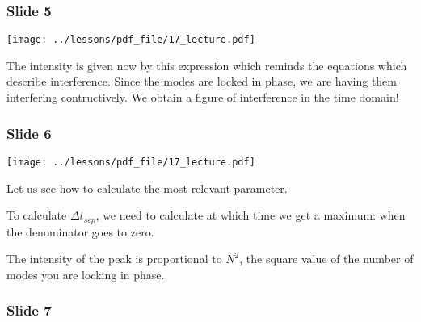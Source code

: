\documentclass[../main/main.tex]{subfiles}
\begin{document}
\subsubsection*{Slide 5}

\begin{minipage}[]{0.5\linewidth}
\centering
\texttt{[image: ../lessons/pdf\_file/17\_lecture.pdf]}
\end{minipage}
\hspace{0.3cm}\vspace{0.3cm}
\begin{minipage}[c]{0.47\linewidth}

The intensity is given now by this expression which reminds the equations which describe interference. Since the modes are locked in phase, we are having them interfering contructively. We obtain a figure of interference in the time domain!

\end{minipage}

\subsubsection*{Slide 6}

\begin{minipage}[]{0.5\linewidth}
\centering
\texttt{[image: ../lessons/pdf\_file/17\_lecture.pdf]}
\end{minipage}
\hspace{0.3cm}\vspace{0.3cm}
\begin{minipage}[c]{0.47\linewidth}

Let us see how to calculate the most relevant parameter.

To calculate \( \Delta t_{sep} \), we need to calculate at which time we get a maximum: when the denominator goes to zero.

The intensity of the peak is proportional to \( N^2 \), the square value of the number of modes you are locking in phase.

\end{minipage}

\newpage

\subsubsection*{Slide 7}
\end{document}
